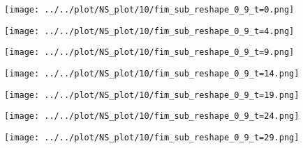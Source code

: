 \documentclass[
]{article}
\begin{document}
\begin{figure}

\begin{minipage}{0.20\linewidth}

\texttt{[image: ../../plot/NS\_plot/10/fim\_sub\_reshape\_0\_9\_t=0.png]}

\end{minipage}%
%
\begin{minipage}{0.20\linewidth}

\texttt{[image: ../../plot/NS\_plot/10/fim\_sub\_reshape\_0\_9\_t=4.png]}

\end{minipage}%
%
\begin{minipage}{0.20\linewidth}

\texttt{[image: ../../plot/NS\_plot/10/fim\_sub\_reshape\_0\_9\_t=9.png]}

\end{minipage}%
%
\begin{minipage}{0.20\linewidth}

\texttt{[image: ../../plot/NS\_plot/10/fim\_sub\_reshape\_0\_9\_t=14.png]}

\end{minipage}%
%
\begin{minipage}{0.20\linewidth}

\texttt{[image: ../../plot/NS\_plot/10/fim\_sub\_reshape\_0\_9\_t=19.png]}

\end{minipage}%
\newline
\begin{minipage}{0.20\linewidth}

\texttt{[image: ../../plot/NS\_plot/10/fim\_sub\_reshape\_0\_9\_t=24.png]}

\end{minipage}%
%
\begin{minipage}{0.20\linewidth}

\texttt{[image: ../../plot/NS\_plot/10/fim\_sub\_reshape\_0\_9\_t=29.png]}

\end{minipage}%
%
\begin{minipage}{0.20\linewidth}


\end{minipage}
\end{figure}
\end{document}
